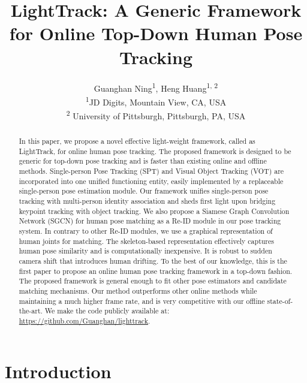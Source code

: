 \documentclass[10pt,twocolumn,letterpaper]{article}
\begin{document}
	
\title{LightTrack: A Generic Framework for Online Top-Down Human Pose Tracking}
	
	\author{Guanghan Ning\textsuperscript{1}, Heng Huang\textsuperscript{1, 2}\\
\textsuperscript{1}JD Digits, Mountain View, CA, USA\\
		\textsuperscript{2} University of Pittsburgh, Pittsburgh, PA, USA\\
}
	
	\maketitle


	
\begin{abstract}
		In this paper, we propose a novel effective light-weight framework, called as LightTrack, for online human pose tracking. The proposed framework is designed to be generic for top-down pose tracking and is faster than existing online and offline methods. 
		Single-person Pose Tracking (SPT) and Visual Object Tracking (VOT) are incorporated into one unified functioning entity, easily implemented by a replaceable single-person pose estimation module. Our framework unifies single-person pose tracking with multi-person identity association and sheds first light upon bridging keypoint tracking with object tracking.
		We also propose a Siamese Graph Convolution Network (SGCN) for human pose matching as a Re-ID module in our pose tracking system. In contrary to other Re-ID modules, we use a graphical representation of human joints for matching. The skeleton-based representation effectively captures human pose similarity and is computationally inexpensive. It is robust to sudden camera shift that introduces human drifting.
		To the best of our knowledge, this is the first paper to propose an online human pose tracking framework in a top-down fashion. The proposed framework is general enough to fit other pose estimators and candidate matching mechanisms.
		Our method outperforms other online methods while maintaining a much higher frame rate, and is very competitive with our offline state-of-the-art.
		We make the code publicly available at: \href{https://github.com/Guanghan/lighttrack}{https://github.com/Guanghan/lighttrack}.
	\end{abstract}
	
	
	
	
	
\section{Introduction}
	
\end{document}
